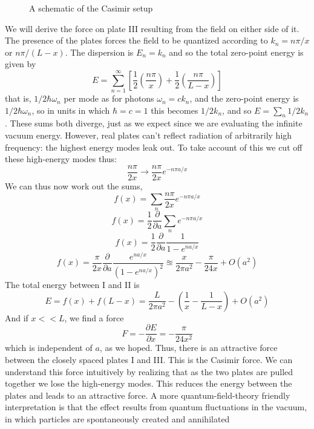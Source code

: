 \begin{tcolorbox}
\begin{figure}[!ht]
	\caption{A schematic of the Casimir setup}
\end{figure}
We will derive the force on plate III resulting from the field on either side of it. The presence of the plates forces the field to be quantized according to $k_{n} = n \pi/x$ or $n\pi/(L − x)$. The
dispersion is $E_{n} = k_{n}$ and so the total zero-point energy is given by
\begin{equation}
    E = \sum_{n= 1}^{\infty} \left[\frac{1}{2} \left( \frac{n \pi}{x} \right) + \frac{1}{2} \left( \frac{n \pi}{L - x} \right)\right]
\end{equation}
that is, $1/2\hbar \omega_{n}$ per mode as for photons $\omega_{n} = ck_{n}$, and the zero-point energy is $1/2\hbar \omega_{n}$, so in
units in which $\hbar = c = 1$ this becomes
$1/2k_{n}$, and so $E = \sum_{n} 1/2k_{n}$. These sums both diverge, just as we expect since we are evaluating the infinite vacuum energy.
However, real plates can’t reflect radiation of arbitrarily high frequency: the highest energy modes leak out. To take account of this we cut off these high-energy modes
thus:
\begin{equation}
    \frac{n \pi}{2x} \rightarrow \frac{n \pi}{2x}e^{-n \pi a/x}
\end{equation}
We can thus now work out the sums,
$$f(x) = \sum_{n} \frac{n \pi}{2x} e^{-n \pi a/x}$$
$$f(x) = \frac{1}{2} \frac{\partial}{\partial a} \sum_{n}  e^{-n \pi a/x}$$
$$f(x) = \frac{1}{2} \frac{\partial}{\partial a} \frac{1}{1 - e^{n a/x}}$$
\begin{equation}
    f(x) = \frac{\pi}{2x} \frac{\partial}{\partial a} \frac{e^{n a/x}}{{(1 - e^{n a/x})}^{2}} \approxeq \frac{x}{2 \pi a^{2}} - \frac{\pi}{24x} + O(a^{2})
\end{equation}
The total energy between I and II is 
\begin{equation}
    E = f(x) + f(L -x) = \frac{L}{2 \pi a^{2}} - \left(\frac{1}{x} - \frac{1}{L-x}\right) + O(a^{2})
\end{equation}
And if $x << L$, we find a force
\begin{equation}
    F = -\frac{\partial E}{\partial x} = -\frac{\pi}{24 x^{2}}
\end{equation}
which is independent of $a$, as we hoped. Thus, there is an attractive force between
the closely spaced plates I and III. This is the Casimir force. We can understand
this force intuitively by realizing that as the two plates are pulled together we lose
the high-energy modes. This reduces the energy between the plates and leads to
an attractive force. A more quantum-field-theory friendly interpretation is that the
effect results from quantum fluctuations in the vacuum, in which particles are spontaneously created and annihilated
\end{tcolorbox}

